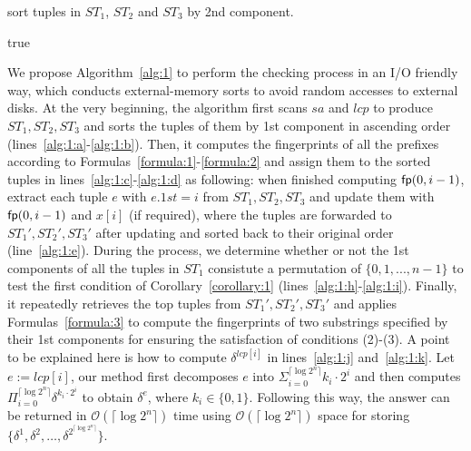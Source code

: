 \documentclass[10pt,journal,compsoc]{IEEEtran}
\begin{document}
\begin{algorithm*}
{		sort tuples in $ST_1$, $ST_2$ and $ST_3$ by 2nd component.  \label{alg:1:e}
		
		\For {$i \in [1, n - 1)$}{  \label{alg:1:f}
			
			$fp_1 := ST_1'.{\sf top}().3rd$, $ST_1'.{\sf pop}()$, $fp_2 := ST_2'.{\sf top}().3rd$, $ch_1 := ST_2'.{\sf top}().4th$, $ST_2'.{\sf pop}()$
			
			$\hat{fp_1} = fp2 - fp1 \cdot \delta^{lcp[i]} \! \mod \! P$ \label{alg:1:j}
		
		 	$fp_1 := ST_1'.{\sf top}().3rd$, $fp_3 := ST_2'.{\sf top}().3rd$, $ch_2 := ST_3'.{\sf top}().4th$, $ST_3'.{\sf pop}()$
			
			$\hat{fp_2} = fp3 - fp1 \cdot \delta^{lcp[i]} \! \mod \! P$	\label{alg:1:k}
			
			\If{$\hat{fp_1} \ne \hat{fp_2}$ {\sf or} $ch_1 \le ch_2$}{
				
				\Return false \hspace{5cm} // condition (2) or (3) is violated
			}	
		} \label{alg:1:g}

		\Return true
	}
\end{algorithm*}


We propose Algorithm~\ref{alg:1} to perform the checking process in an I/O friendly way, which conducts external-memory sorts to avoid random accesses to external disks. 
At the very beginning, the algorithm first scans $sa$ and $lcp$ to produce $ST_1, ST_2, ST_3$ and sorts the tuples of them by 1st component in ascending order (lines~\ref{alg:1:a}-\ref{alg:1:b}). 
Then, it computes the fingerprints of all the prefixes according to Formulas~\ref{formula:1}-\ref{formula:2} and assign them to the sorted tuples in lines~\ref{alg:1:c}-\ref{alg:1:d} as following: when finished computing ${\sf fp}(0, i - 1)$, extract each tuple $e$ with $e.1st = i$ from $ST_1, ST_2, ST_3$  and update them with ${\sf fp}(0, i - 1)$ and $x[i]$ (if required), where the tuples are forwarded to $ST_1', ST_2', ST_3'$ after updating and sorted back to their original order (line~\ref{alg:1:e}). 
During the process, we determine whether or not the 1st components of all the tuples in $ST_1$ consistute a permutation of $\{0, 1, ..., n - 1\}$ to test the first condition of Corollary~\ref{corollary:1} (lines~\ref{alg:1:h}-\ref{alg:1:i}). 
Finally, it repeatedly retrieves the top tuples from $ST_1', ST_2', ST_3'$ and applies Formulas~\ref{formula:3} to compute the fingerprints of two substrings specified by their 1st components for ensuring the satisfaction of conditions (2)-(3). A point to be explained here is how to compute $\delta^{lcp[i]}$ in lines~\ref{alg:1:j} and~\ref{alg:1:k}. Let $e := lcp[i]$, our method first decomposes $e$ into $\Sigma_{i = 0}^{\lceil \log2^n \rceil}{k_i \cdot 2^i}$ and then computes $\Pi_{i = 0}^{\lceil \log2^n \rceil}{\delta}^{k_i \cdot 2^i}$ to obtain $\delta^{e}$, where $k_i \in \{0, 1\}$. Following this way, the answer can be returned in $\mathcal{O}(\lceil \log2^n \rceil)$ time using $\mathcal{O}(\lceil \log2^n \rceil)$ space for storing $\{{\delta}^{1}, {\delta}^{2}, \dots, {\delta}^{2^{\lceil \log2^n \rceil}} \}$. 
\end{document}
